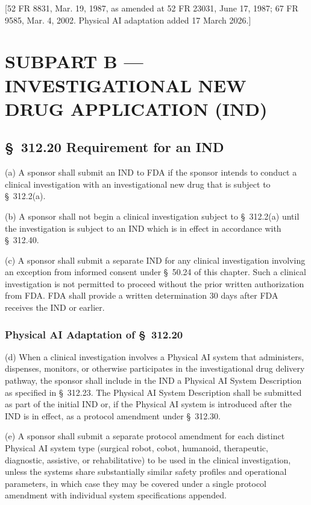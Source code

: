 \documentclass[11pt]{article}
\begin{document}
[52 FR 8831, Mar. 19, 1987, as amended at 52 FR 23031, June 17, 1987; 67 FR 9585, Mar. 4, 2002. Physical AI adaptation added 17 March 2026.]

\clearpage

\section{SUBPART B --- INVESTIGATIONAL NEW DRUG APPLICATION (IND)}

\subsection{\S~312.20 Requirement for an IND}

(a) A sponsor shall submit an IND to FDA if the sponsor intends to conduct a clinical investigation with an investigational new drug that is subject to \S~312.2(a).

(b) A sponsor shall not begin a clinical investigation subject to \S~312.2(a) until the investigation is subject to an IND which is in effect in accordance with \S~312.40.

(c) A sponsor shall submit a separate IND for any clinical investigation involving an exception from informed consent under \S~50.24 of this chapter. Such a clinical investigation is not permitted to proceed without the prior written authorization from FDA. FDA shall provide a written determination 30 days after FDA receives the IND or earlier.

\subsubsection{Physical AI Adaptation of \S~312.20}

(d) When a clinical investigation involves a Physical AI system that administers, dispenses, monitors, or otherwise participates in the investigational drug delivery pathway, the sponsor shall include in the IND a Physical AI System Description as specified in \S~312.23. The Physical AI System Description shall be submitted as part of the initial IND or, if the Physical AI system is introduced after the IND is in effect, as a protocol amendment under \S~312.30.

(e) A sponsor shall submit a separate protocol amendment for each distinct Physical AI system type (surgical robot, cobot, humanoid, therapeutic, diagnostic, assistive, or rehabilitative) to be used in the clinical investigation, unless the systems share substantially similar safety profiles and operational parameters, in which case they may be covered under a single protocol amendment with individual system specifications appended.
\end{document}
